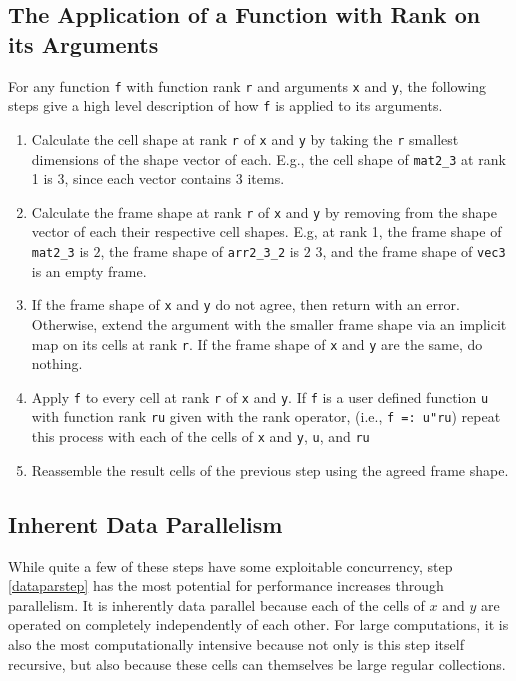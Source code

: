 \subsection{The Application of a Function with Rank on its Arguments}
\label{fridp}
For any function \texttt{f} with function rank \texttt{r} and arguments \texttt{x} and \texttt{y}, 
the following steps give a high level description of how \texttt{f} is applied to its arguments\cite{rankanduni}.
\begin{enumerate}
	\item Calculate the cell shape at rank \texttt{r} of \texttt{x} and \texttt{y} 
		by taking the \texttt{r} smallest dimensions of the shape vector of each.
		E.g., the cell shape of \texttt{mat2\_3} at rank 1 is 3, since each vector contains 3 items.
	\item Calculate the frame shape at rank \texttt{r} of \texttt{x} and \texttt{y} 
		by removing from the shape vector of each their respective cell shapes.
		E.g, at rank 1, the frame shape of \texttt{mat2\_3} is $2$,
		the frame shape of \texttt{arr2\_3\_2} is $2$ $3$, 
		and the frame shape of \texttt{vec3} is an empty frame.
	\item If the frame shape of \texttt{x} and \texttt{y} do not agree, then return with an error.
		Otherwise, extend the argument with the smaller frame shape via an implicit map on its cells at rank \texttt{r}.
		If the frame shape of \texttt{x} and \texttt{y} are the same, do nothing.
	\item \label{dataparstep}Apply \texttt{f} to every cell at rank \texttt{r} of \texttt{x} and \texttt{y}.
		If \texttt{f} is a user defined function \texttt{u} with function rank \texttt{ru} given with the rank operator,
		(i.e., \texttt{f =: u"ru})
		repeat this process with each of the cells of \texttt{x} and \texttt{y}, \texttt{u}, and \texttt{ru}
	\item Reassemble the result cells of the previous step using the agreed frame shape.
\end{enumerate}

\subsection{Inherent Data Parallelism}
While quite a few of these steps have some exploitable concurrency, 
step \ref{dataparstep} has the most potential for performance increases through parallelism.
It is inherently data parallel because each of the cells of $x$ and $y$ are operated on completely independently of each other.
For large computations, it is also the most computationally intensive 
because not only is this step itself recursive, but
also because these cells can themselves be large regular collections.

